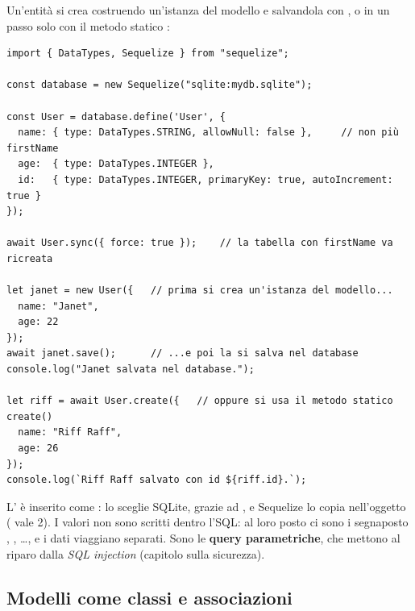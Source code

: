 Un'entità si crea costruendo un'istanza del modello e salvandola con
, o in un passo solo con il metodo statico :

\begingroup\codicepiccolo
\begin{lstlisting}[style=js, name=utenti.js]
import { DataTypes, Sequelize } from "sequelize";

const database = new Sequelize("sqlite:mydb.sqlite");

const User = database.define('User', {
  name: { type: DataTypes.STRING, allowNull: false },     // non più firstName
  age:  { type: DataTypes.INTEGER },
  id:   { type: DataTypes.INTEGER, primaryKey: true, autoIncrement: true }
});

await User.sync({ force: true });    // la tabella con firstName va ricreata

let janet = new User({   // prima si crea un'istanza del modello...
  name: "Janet",
  age: 22
});
await janet.save();      // ...e poi la si salva nel database
console.log("Janet salvata nel database.");

let riff = await User.create({   // oppure si usa il metodo statico create()
  name: "Riff Raff",
  age: 26
});
console.log(`Riff Raff salvato con id ${riff.id}.`);
\end{lstlisting}
\endgroup


L' è inserito come : lo sceglie SQLite, grazie ad
, e Sequelize lo copia nell'oggetto ( vale 2).
I valori non sono scritti dentro l'SQL: al loro posto ci sono i segnaposto
, , \ldots, e i dati viaggiano separati. Sono le
\textbf{query parametriche}, che mettono al riparo dalla \textit{SQL injection}
(capitolo sulla sicurezza).

\subsection{Modelli come classi e associazioni}

